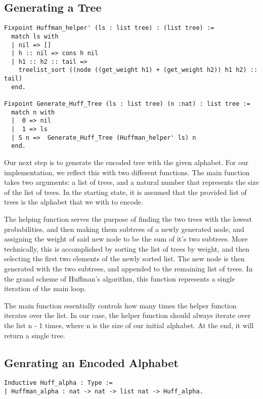 \documentclass{llncs}
\begin{document}
\subsection{Generating a Tree}

\begin{lstlisting}
Fixpoint Huffman_helper' (ls : list tree) : (list tree) :=
  match ls with
  | nil => [] 
  | h :: nil => cons h nil
  | h1 :: h2 :: tail =>
    treelist_sort ((node ((get_weight h1) + (get_weight h2)) h1 h2) :: tail)
  end.

Fixpoint Generate_Huff_Tree (ls : list tree) (n :nat) : list tree :=
  match n with
  |  0 => nil
  |  1 => ls
  | S n =>  Generate_Huff_Tree (Huffman_helper' ls) n
  end.
\end{lstlisting}

Our next step is to generate the encoded tree with the given alphabet. For our implementation, we reflect this with two different functions. The main function takes two arguments: a list of trees, and a natural number that represents the size of the list of trees. In the starting state, it is assumed that the provided list of trees is the alphabet that we with to encode.

The helping function serves the purpose of finding the two trees with the lowest probabilities, and then making them subtrees of a newly generated node, and assigning the weight of said new node to be the sum of it’s two subtrees.  More technically, this is accomplished by sorting the list of trees by weight, and then selecting the first two elements of the newly sorted list. The new node is then generated with the two subtrees, and appended to the remaining list of trees. In the grand scheme of Huffman’s algorithm, this function represents a single iteration of the main loop.

The main function essentially controls how many times the helper function iterates over the list. In our case, the helper function should always iterate over the list  n - 1 times, where n is the size of our initial alphabet. At the end, it will return a single tree.


\subsection{Genrating an Encoded Alphabet}

\begin{lstlisting}
Inductive Huff_alpha : Type :=
| Huffman_alpha : nat -> nat -> list nat -> Huff_alpha.
\end{lstlisting}
\end{document}
